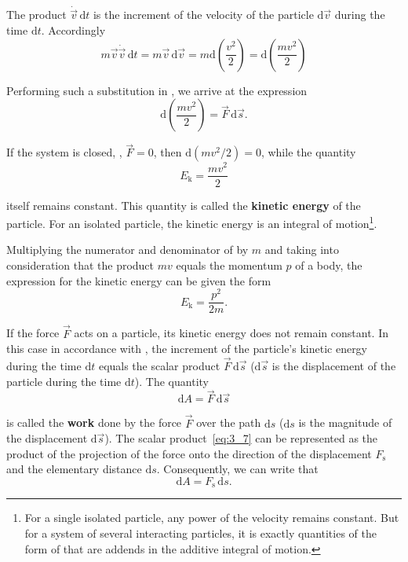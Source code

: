 \noindent
The product $\dot{\vec{v}}\,\mathrm{d}t$ is the increment of the velocity of the particle $\mathrm{d}\vec{v}$ during the time $\mathrm{d}t$. Accordingly
\begin{equation}\label{eq:3_3}
m\vec{v}\dot{\vec{v}}\,\mathrm{d}t = m\vec{v}\,\mathrm{d}\vec{v} = m\mathrm{d}\!\left(\frac{v^2}{2}\right) = \mathrm{d}\!\left(\frac{mv^2}{2}\right)
\end{equation}

\noindent
Performing such a substitution in , we arrive at the expression
\begin{equation}\label{eq:3_4}
\mathrm{d}\!\left(\frac{mv^2}{2}\right) = \vec{F}\,\mathrm{d}\vec{s}.
\end{equation}

\noindent
If the system is closed, \ie, $\vec{F}=0$, then $\mathrm{d}(mv^2/2)=0$, while the quantity
\begin{equation}\label{eq:3_5}
E_{\text{k}} = \frac{mv^2}{2}
\end{equation}

\noindent
itself remains constant. This quantity is called the \textbf{kinetic energy} of the particle. For an isolated particle, the kinetic energy is an integral of motion\footnote{For a single isolated particle, any power of the velocity remains constant. But for a system of several interacting particles, it is exactly quantities of the form of  that are addends in the additive integral of motion.}.

Multiplying the numerator and denominator of  by $m$ and taking into consideration that the product $mv$ equals the momentum $p$ of a body, the expression for the kinetic energy can be given the form
\begin{equation}\label{eq:3_6}
E_{\text{k}} = \frac{p^2}{2m}.
\end{equation}

\noindent
If the force $\vec{F}$ acts on a particle, its kinetic energy does not remain constant. In this case in accordance with , the increment of the particle's kinetic energy during the time $\mathrm{d}t$ equals the scalar product $\vec{F}\,\mathrm{d}\vec{s}$ ($\mathrm{d}\vec{s}$ is the displacement of the particle during the time $\mathrm{d}t$). The quantity
\begin{equation}\label{eq:3_7}
\mathrm{d}A = \vec{F}\,\mathrm{d}\vec{s}
\end{equation}

\noindent
is called the \textbf{work} done by the force $\vec{F}$ over the path $\mathrm{d}s$ ($\mathrm{d}s$ is the magnitude of the displacement $\mathrm{d}\vec{s}$). The scalar product~\eqref{eq:3_7} can be represented as the product of the projection of the force onto the direction of the displacement $F_{\text{s}}$ and the elementary distance $\mathrm{d}s$. Consequently, we can write that
\begin{equation}\label{eq:3_8}
\mathrm{d}A = F_{\text{s}}\,\mathrm{d}s.
\end{equation}

